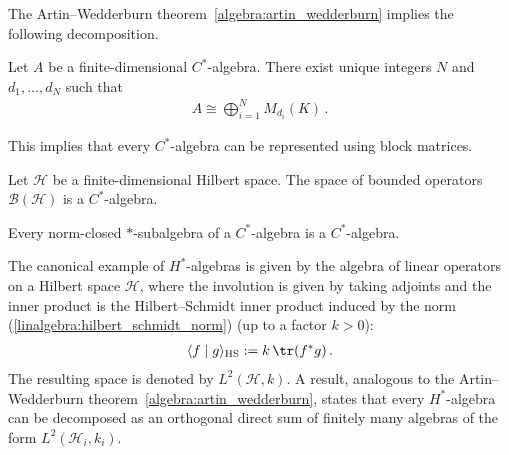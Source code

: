     The Artin--Wedderburn theorem~\ref{algebra:artin_wedderburn} implies the following decomposition.
    \begin{theorem}
        Let $A$ be a finite-dimensional $C^*$-algebra. There exist unique integers $N$ and $d_1,\ldots,d_N$ such that
        \begin{gather}
            A\cong\bigoplus_{i=1}^NM_{d_i}(K)\,.
        \end{gather}
    \end{theorem}
    This implies that every $C^*$-algebra can be represented using block matrices.

    \begin{example}
        Let $\mathcal{H}$ be a finite-dimensional Hilbert space. The space of bounded operators $\mathcal{B}(\mathcal{H})$ is a $C^*$-algebra.
    \end{example}

    \begin{property}
        Every norm-closed $\ast$-subalgebra of a $C^*$-algebra is a $C^*$-algebra.
    \end{property}

    \begin{example}\label{operators:hilbert_schmidt_inner_product}
        The canonical example of $H^*$-algebras is given by the algebra of linear operators on a Hilbert space $\mathcal{H}$, where the involution is given by taking adjoints and the inner product is the Hilbert--Schmidt inner product induced by the norm (\cref{linalgebra:hilbert_schmidt_norm}) (up to a factor $k>0$):
        \begin{gather}
            \langle f\mid g\rangle_{\text{HS}} := k\,\tr(f^*g)\,.
        \end{gather}
        The resulting space is denoted by $L^2(\mathcal{H},k)$. A result, analogous to the Artin--Wedderburn theorem~\ref{algebra:artin_wedderburn}, states that every $H^*$-algebra can be decomposed as an orthogonal direct sum of finitely many algebras of the form $L^2(\mathcal{H}_i,k_i)$.
    \end{example}

